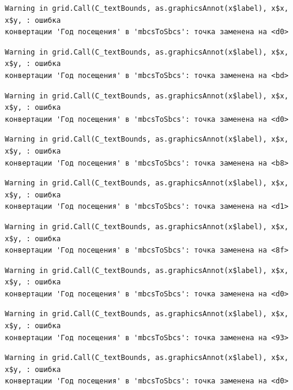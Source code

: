 \documentclass[
  letterpaper,
  DIV=11,
  numbers=noendperiod]{scrreprt}
\begin{document}
\begin{verbatim}
Warning in grid.Call(C_textBounds, as.graphicsAnnot(x$label), x$x, x$y, : ошибка
конвертации 'Год посещения' в 'mbcsToSbcs': точка заменена на <d0>
\end{verbatim}

\begin{verbatim}
Warning in grid.Call(C_textBounds, as.graphicsAnnot(x$label), x$x, x$y, : ошибка
конвертации 'Год посещения' в 'mbcsToSbcs': точка заменена на <bd>
\end{verbatim}

\begin{verbatim}
Warning in grid.Call(C_textBounds, as.graphicsAnnot(x$label), x$x, x$y, : ошибка
конвертации 'Год посещения' в 'mbcsToSbcs': точка заменена на <d0>
\end{verbatim}

\begin{verbatim}
Warning in grid.Call(C_textBounds, as.graphicsAnnot(x$label), x$x, x$y, : ошибка
конвертации 'Год посещения' в 'mbcsToSbcs': точка заменена на <b8>
\end{verbatim}

\begin{verbatim}
Warning in grid.Call(C_textBounds, as.graphicsAnnot(x$label), x$x, x$y, : ошибка
конвертации 'Год посещения' в 'mbcsToSbcs': точка заменена на <d1>
\end{verbatim}

\begin{verbatim}
Warning in grid.Call(C_textBounds, as.graphicsAnnot(x$label), x$x, x$y, : ошибка
конвертации 'Год посещения' в 'mbcsToSbcs': точка заменена на <8f>
\end{verbatim}

\begin{verbatim}
Warning in grid.Call(C_textBounds, as.graphicsAnnot(x$label), x$x, x$y, : ошибка
конвертации 'Год посещения' в 'mbcsToSbcs': точка заменена на <d0>
\end{verbatim}

\begin{verbatim}
Warning in grid.Call(C_textBounds, as.graphicsAnnot(x$label), x$x, x$y, : ошибка
конвертации 'Год посещения' в 'mbcsToSbcs': точка заменена на <93>
\end{verbatim}

\begin{verbatim}
Warning in grid.Call(C_textBounds, as.graphicsAnnot(x$label), x$x, x$y, : ошибка
конвертации 'Год посещения' в 'mbcsToSbcs': точка заменена на <d0>
\end{verbatim}
\end{document}
